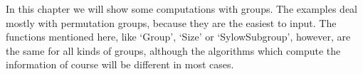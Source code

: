 


In this chapter we will show  some computations with groups. The examples
deal mostly with permutation groups, because they are the easiest 
to input.  The functions mentioned here, like `Group', `Size' or
`SylowSubgroup', however, are the same for all  kinds of groups, although
the algorithms which compute the information  of course will be different
in most cases.


